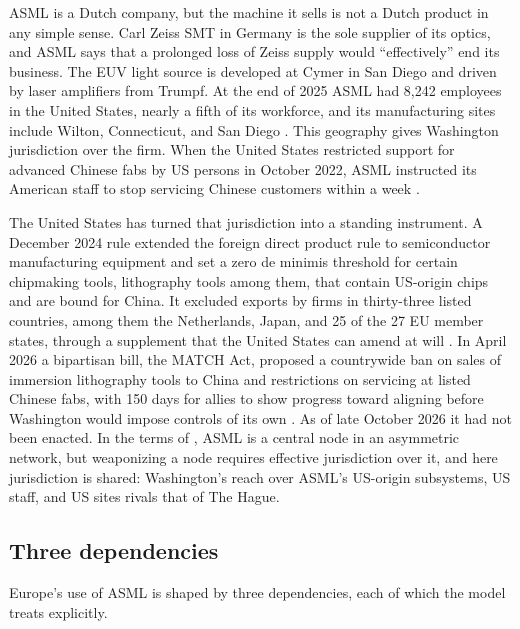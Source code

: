 ASML is a Dutch company, but the machine it sells is not a Dutch product in any simple sense. Carl Zeiss SMT in Germany is the sole supplier of its optics, and ASML says that a prolonged loss of Zeiss supply would ``effectively'' end its business. The EUV light source is developed at Cymer in San Diego and driven by laser amplifiers from Trumpf. At the end of 2025 ASML had 8,242 employees in the United States, nearly a fifth of its workforce, and its manufacturing sites include Wilton, Connecticut, and San Diego \citep{asml2026annual}. This geography gives Washington jurisdiction over the firm. When the United States restricted support for advanced Chinese fabs by US persons in October 2022, ASML instructed its American staff to stop servicing Chinese customers within a week \citep{cnbc2022asml}.

The United States has turned that jurisdiction into a standing instrument. A December 2024 rule extended the foreign direct product rule to semiconductor manufacturing equipment and set a zero de minimis threshold for certain chipmaking tools, lithography tools among them, that contain US-origin chips and are bound for China. It excluded exports by firms in thirty-three listed countries, among them the Netherlands, Japan, and 25 of the 27 EU member states, through a supplement that the United States can amend at will \citep{bis2024fdpr}. In April 2026 a bipartisan bill, the MATCH Act, proposed a countrywide ban on sales of immersion lithography tools to China and restrictions on servicing at listed Chinese fabs, with 150 days for allies to show progress toward aligning before Washington would impose controls of its own \citep{baumgartner2026match}. As of late October 2026 it had not been enacted. In the terms of \citet{farrell2019weaponized}, ASML is a central node in an asymmetric network, but weaponizing a node requires effective jurisdiction over it, and here jurisdiction is shared: Washington's reach over ASML's US-origin subsystems, US staff, and US sites rivals that of The Hague.

\subsection{Three dependencies}

Europe's use of ASML is shaped by three dependencies, each of which the model treats explicitly.

